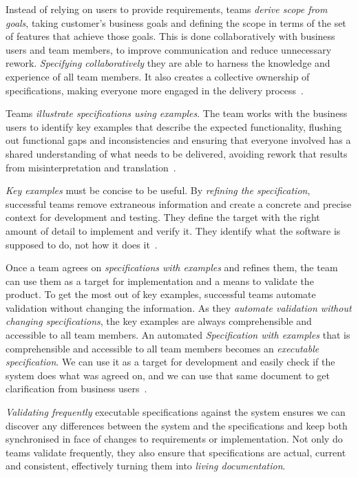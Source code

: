 \documentclass[dissertation,final]{softeng}
\begin{document}
Instead of relying on users to provide requirements, teams \emph{derive scope from goals}, taking customer's business goals and defining the scope in terms of the set of features that achieve those goals. This is done collaboratively with business users and team members, to improve communication and reduce unnecessary rework. \emph{Specifying collaboratively} they are able to harness the knowledge and experience of all team members. It also creates a collective ownership of specifications, making everyone more engaged in the delivery process~\citep{Adzic201106}.

Teams \emph{illustrate specifications using examples}. The team works with the business users to identify key examples that describe the expected functionality, flushing out functional gaps and inconsistencies and ensuring that everyone involved has a shared understanding of what needs to be delivered, avoiding rework that results from misinterpretation and translation~\citep{Adzic201106}.

\emph{Key examples} must be concise to be useful. By \emph{refining the specification}, successful teams remove extraneous information and create a concrete and precise context for development and testing. They define the target with the right amount of detail to implement and verify it. They identify what the software is supposed to do, not how it does it~\citep{Adzic201106}.

Once a team agrees on \emph{specifications with examples} and refines them, the team can use them as a target for implementation and a means to validate the product. To get the most out of key examples, successful teams automate validation without changing the information. As they\emph{ automate validation without changing specifications}, the key examples are always comprehensible and accessible to all team members. An automated \emph{Specification with examples} that is comprehensible and accessible to all team members becomes an \emph{executable specification}. We can use it as a target for development and easily check if the system does what was agreed on, and we can use that same document to get clarification from business users~\citep{Adzic201106}.

\emph{Validating frequently} executable specifications against the system ensures we can discover any differences between the system and the specifications and keep both synchronised in face of changes to requirements or implementation. Not only do teams validate frequently, they also ensure that specifications are actual, current and consistent, effectively turning them into \emph{living documentation}.
\end{document}
